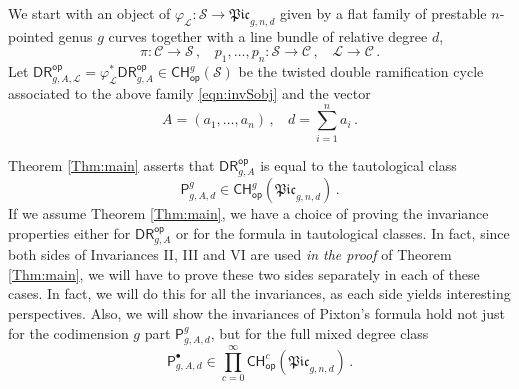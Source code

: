 \documentclass[a4paper,12pt]{article} %
\newcommand{\ca}[1]{{\mathcal{#1}}}
\def\P{\mathsf{P}}
\theoremstyle{definition}
\theoremstyle{plain}%
\renewcommand{\phi}{\varphi}
\newcommand{\Picabs}{\mathfrak{Pic}}
\newcommand{\Chow}{\mathsf{CH}}
\newcommand{\CHop}{\Chow_{\mathsf{op}}}
\newcommand{\invnrn}{II}
\newcommand{\invnrA}{III}
\newcommand{\invnrIV}{VI}
\newcommand{\DRop}{\mathsf{DR}^{\mathsf{op}}}
\begin{document}
We start with an object of $\phi_\ca L\colon \mathcal S \to \Picabs_{g,n,d}$ 
given by
a flat family of prestable $n$-pointed genus $g$ curves together with a line bundle of relative degree $d$,
    \begin{equation}
    \label{eqn:invSobj}    
    \pi:\mathcal{C} \rightarrow \mathcal{S}\, , \ \ \ \ p_1,\ldots,p_n: \mathcal{S} \rightarrow \mathcal{C}\, , \ \ \ \
        \mathcal{L} \rightarrow \mathcal{C}\, .
        \end{equation}
    Let $\mathsf{DR}^{\mathsf{op}}_{g,A,\mathcal{L}}= \phi_\ca L^*\DRop_{g,A}\in \mathsf{CH}^g_{\mathsf{op}}(\mathcal{S})$
    be the twisted double ramification cycle associated to the above
    family \eqref{eqn:invSobj} and
     the vector
    $$A=(a_1,\ldots, a_n)\, , \ \ \ \ d =\sum_{i=1}^n a_i\, .$$


Theorem \ref{Thm:main} asserts that  $\DRop_{g,A}$ is equal to
the tautological class
$$\P^g_{g,A,d} \in \CHop^g(\Picabs_{g,n,d})\, .$$ If we
assume Theorem \ref{Thm:main}, we have a choice of proving the invariance properties either for $\DRop_{g,A}$ or for the formula in tautological classes. In fact, since both
sides of Invariances \invnrn, \invnrA{} and
\invnrIV{} are used {\em in the proof} of Theorem \ref{Thm:main},
we will have to prove these two sides separately in each of these cases. 
In fact, we will do this for all the invariances, as each side yields interesting perspectives. Also, we will show the invariances of Pixton's formula hold
not just for 
the codimension $g$ part $\P^g_{g,A,d}$, but for the full mixed degree class
\[\P^\bullet_{g,A,d} \in \prod_{c=0}^\infty \CHop^c(\Picabs_{g,n,d})\, .\]

\end{document}
